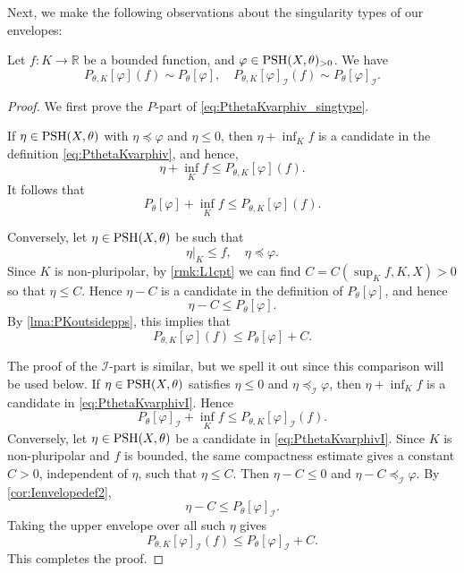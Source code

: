 Next, we make the following observations about the singularity types of our envelopes:
\begin{lemma}\label{lma:same_sing_type} Let $f \colon K\rightarrow \mathbb{R}$ be a bounded function, and $\varphi\in \mathrm{PSH}(X,\theta)_{>0}$. We have
\begin{equation}\label{eq:PthetaKvarphiv_singtype}
P_{\theta,K}[\varphi](f)\sim P_{\theta}[\varphi],\quad P_{\theta,K}[\varphi]_{\mathcal{I}}(f)\sim P_{\theta}[\varphi]_{\mathcal{I}}.
\end{equation}
\end{lemma}
\begin{proof}
    We first prove the $P$-part of \eqref{eq:PthetaKvarphiv_singtype}.

    If $\eta\in \mathrm{PSH}(X,\theta)$ with $\eta\preceq \varphi$ and $\eta\leq 0$, then $\eta+\inf_K f$ is a candidate in the definition \eqref{eq:PthetaKvarphiv}, and hence,
    \[
    \eta +\inf_K f \leq P_{\theta,K}[\varphi](f).
    \]
    It follows that
    \[
        P_{\theta}[\varphi]+\inf_K f \leq P_{\theta,K}[\varphi](f).
    \]

    Conversely, let $\eta\in \mathrm{PSH}(X,\theta)$ be such that
    \[
        \eta|_K\leq f,\quad \eta\preceq \varphi.
    \]
    Since $K$ is non-pluripolar, by \cref{rmk:L1cpt} we can find $C=C(\sup_K f,K, X)>0$ so that $\eta\leq C$. Hence $\eta-C$ is a candidate in the definition of $P_{\theta}[\varphi]$, and hence
    \[
        \eta-C\leq P_{\theta}[\varphi].
    \]
    By \cref{lma:PKoutsidepps}, this implies that
    \[
        P_{\theta,K}[\varphi](f) \leq P_{\theta}[\varphi] + C.
    \]

    The proof of the $\mathcal{I}$-part is similar, but we spell it out since this comparison will be used below. If $\eta\in \mathrm{PSH}(X,\theta)$ satisfies $\eta\leq 0$ and $\eta\preceq_{\mathcal{I}}\varphi$, then $\eta+\inf_K f$ is a candidate in \eqref{eq:PthetaKvarphivI}. Hence
    \[
        P_{\theta}[\varphi]_{\mathcal{I}}+\inf_K f\leq P_{\theta,K}[\varphi]_{\mathcal{I}}(f).
    \]
    Conversely, let $\eta\in \mathrm{PSH}(X,\theta)$ be a candidate in \eqref{eq:PthetaKvarphivI}. Since $K$ is non-pluripolar and $f$ is bounded, the same compactness estimate gives a constant $C>0$, independent of $\eta$, such that $\eta\leq C$. Then $\eta-C\leq 0$ and $\eta-C\preceq_{\mathcal{I}}\varphi$. By \cref{cor:Ienvelopedef2},
    \[
        \eta-C\leq P_{\theta}[\varphi]_{\mathcal{I}}.
    \]
    Taking the upper envelope over all such $\eta$ gives
    \[
        P_{\theta,K}[\varphi]_{\mathcal{I}}(f)\leq P_{\theta}[\varphi]_{\mathcal{I}}+C.
    \]
    This completes the proof.
\end{proof}

